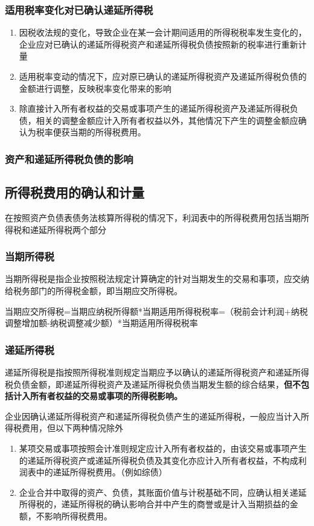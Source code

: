 \documentclass[UTF8,12pt]{ctexart}
\numberwithin{equation}{section} %
\numberwithin{figure}{section}
\numberwithin{table}{section}
\begin{document}
	
	\subsubsection{适用税率变化对已确认递延所得税}
	\begin{enumerate}
		\item 因税收法规的变化，导致企业在某一会计期间适用的所得税税率发生变化的，企业应对已确认的递延所得税资产和递延所得税负债按照新的税率进行重新计量
		
		\item 适用税率变动的情况下，应对原已确认的递延所得税资产及递延所得税负债的金额进行调整，反映税率变化带来的影响
		
		\item 除直接计入所有者权益的交易或事项产生的递延所得税资产及递延所得税负债，相关的调整金额应计入所有者权益以外，其他情况下产生的调整金额应确认为税率便获当期的所得税费用。
	\end{enumerate}
	\subsubsection{资产和递延所得税负债的影响}
	
	\subsection{所得税费用的确认和计量}
	在按照资产负债表债务法核算所得税的情况下，利润表中的所得税费用包括当期所得税和递延所得税两个部分
	\subsubsection{当期所得税}
	当期所得税是指企业按照税法规定计算确定的针对当期发生的交易和事项，应交纳给税务部门的所得税金额，即当期应交所得税。
	
	当期应交所得税=当期应纳税所得额*当期适用所得税税率=（税前会计利润+纳税调整增加额-纳税调整减少额）*当期适用所得税税率
	\subsubsection{递延所得税}
	递延所得税是指按照所得税准则规定当期应予以确认的递延所得税资产和递延所得税负债金额，即递延所得税资产及递延所得税负债当期发生额的综合结果，\textbf{但不包括计入所有者权益的交易或事项的所得税影响。}
	
	企业因确认递延所得税资产和递延所得税负债产生的递延所得税，一般应当计入所得税费用，但以下两种情况除外
	\begin{enumerate}
		\item 某项交易或事项按照会计准则规定应计入所有者权益的，由该交易或事项产生的递延所得税资产或递延所得税负债及其变化亦应计入所有者权益，不构成利润表中的递延所得税费用。（例如综债）
		
		\item 企业合并中取得的资产、负债，其账面价值与计税基础不同，应确认相关递延所得税的，递延所得税的确认影响合并中产生的商誉或是计入当期损益的金额，不影响所得税费用。
	\end{enumerate}
\end{document}

